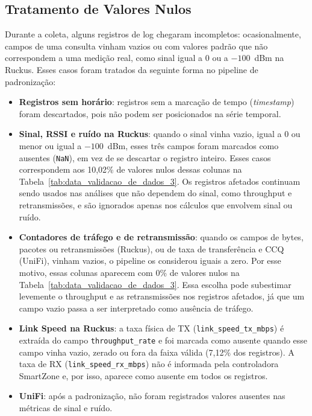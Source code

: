 \subsection{Tratamento de Valores Nulos}

Durante a coleta, alguns registros de log chegaram incompletos: ocasionalmente, campos de uma consulta vinham vazios ou com valores padrão que não correspondem a uma medição real, como sinal igual a 0 ou a $-100$~dBm na Ruckus. Esses casos foram tratados da seguinte forma no pipeline de padronização:

\begin{itemize}
  \item \textbf{Registros sem horário}: registros sem a marcação de tempo (\textit{timestamp}) foram descartados, pois não podem ser posicionados na série temporal.
  \item \textbf{Sinal, RSSI e ruído na Ruckus}: quando o sinal vinha vazio, igual a 0 ou menor ou igual a $-100$~dBm, esses três campos foram marcados como ausentes (\texttt{NaN}), em vez de se descartar o registro inteiro. Esses casos correspondem aos 10,02\% de valores nulos dessas colunas na Tabela~\ref{tab:data_validacao_de_dados_3}. Os registros afetados continuam sendo usados nas análises que não dependem do sinal, como throughput e retransmissões, e são ignorados apenas nos cálculos que envolvem sinal ou ruído.
  \item \textbf{Contadores de tráfego e de retransmissão}: quando os campos de bytes, pacotes ou retransmissões (Ruckus), ou de taxa de transferência e CCQ (UniFi), vinham vazios, o pipeline os considerou iguais a zero. Por esse motivo, essas colunas aparecem com 0\% de valores nulos na Tabela~\ref{tab:data_validacao_de_dados_3}. Essa escolha pode subestimar levemente o throughput e as retransmissões nos registros afetados, já que um campo vazio passa a ser interpretado como ausência de tráfego.
  \item \textbf{Link Speed na Ruckus}: a taxa física de TX (\texttt{link\_speed\_tx\_mbps}) é extraída do campo \texttt{throughput\_rate} e foi marcada como ausente quando esse campo vinha vazio, zerado ou fora da faixa válida (7,12\% dos registros). A taxa de RX (\texttt{link\_speed\_rx\_mbps}) não é informada pela controladora SmartZone e, por isso, aparece como ausente em todos os registros.
  \item \textbf{UniFi}: após a padronização, não foram registrados valores ausentes nas métricas de sinal e ruído.
\end{itemize}

